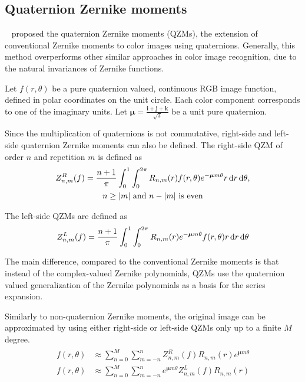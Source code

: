 
\subsection{Quaternion Zernike moments}\label{sec:qzm}
\citeauthor{qzm}~\cite{qzm,qzmi} proposed the quaternion Zernike moments (QZMs), the extension of conventional Zernike moments to color images using quaternions. Generally, this method overperforms other similar approaches in color image recognition, due to the natural invariances of Zernike functions.

Let $f(r,\theta)$ be a pure quaternion valued, continuous RGB image function, defined in polar coordinates on the unit circle. Each color component corresponds to one of the imaginary units. Let $\bm{\mu} = \frac{\mathbf{i} + \mathbf{j} + \mathbf{k}}{\sqrt{3}}$ be a unit pure quaternion.

Since the multiplication of quaternions is not commutative, right-side and left-side quaternion Zernike moments can also be defined. The right-side QZM of order $n$ and repetition $m$ is defined as
\begin{gather*}
  Z_{n,m}^R(f) = \frac{n + 1}{\pi}\int_0^1\int_0^{2\pi}R_{n,m}(r)f(r,\theta)e^{-\bm{\mu}m\theta}r\dif r\dif\theta, \\
  n \geq |m| \text{  and  } n - |m| \text{  is even}
\end{gather*}

The left-side QZMs are defined as 
\begin{gather*}
  Z_{n,m}^L(f) = \frac{n + 1}{\pi}\int_0^1\int_0^{2\pi}R_{n,m}(r)e^{-\bm{\mu}m\theta}f(r,\theta)r\dif r\dif\theta
\end{gather*}

The main difference, compared to the conventional Zernike moments is that instead of the complex-valued Zernike polynomials, QZMs use the quaternion valued generalization of the Zernike polynomials as a basis for the series expansion. 

Similarly to non-quaternion Zernike moments, the original image can be approximated by using either right-side or left-side QZMs only up to a finite $M$ degree.
\begin{gather}
\begin{split}
  f(r,\theta) &\approx \sum_{n=0}^{M}\sum_{m=-n}^{n}Z_{n,m}^R(f)R_{n,m}(r)e^{\bm{\mu}m\theta} \\
  f(r,\theta) &\approx \sum_{n=0}^{M}\sum_{m=-n}^{n}e^{\bm{\mu}m\theta}Z_{n,m}^L(f)R_{n,m}(r)
\end{split}\label{eq:qzm_reconstruction}
\end{gather}

